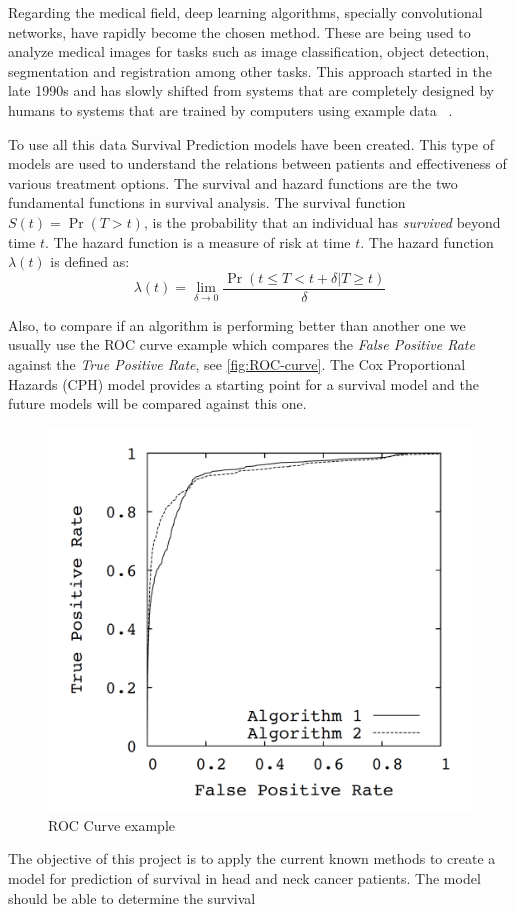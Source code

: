 \documentclass[a4paper]{article}
\begin{document}
Regarding the medical field, deep learning algorithms, specially convolutional networks, have 
rapidly become the chosen method. These are being used to analyze medical images for tasks such as
image classification, object detection, segmentation and registration among other tasks. This
approach started in the late 1990s and has slowly shifted from systems that are completely designed
by humans to systems that are trained by computers using example data
~\cite{survey-deep-learning}.

To use all this data Survival Prediction models have been created. This type of models are
used to understand the relations between patients and effectiveness of various treatment options. 
The survival and hazard functions are the two fundamental functions in survival analysis. The
survival function \( S(t) = \Pr(T > t) \), is the probability that an individual has
\emph{survived} beyond time \( t \). The hazard function is a measure of risk at time \( t \).
The hazard function \( \lambda(t) \) is defined as:
~\cite{DeepSurv}
\[
    \lambda(t) = \lim_{\delta \rightarrow 0}
    \frac{\Pr(t \le T < t + \delta | T \ge t)}{\delta}
\]


Also, to compare if an algorithm is performing better than another one we usually use the ROC curve
example which compares the \emph{False Positive Rate} against the \emph{True Positive Rate},
see \autoref{fig:ROC-curve}. The Cox Proportional Hazards (CPH) model provides a starting point for a 
survival model and the future models will be compared against this one.
~\cites{ROC-precision-recall}{Cox}

\begin{figure}
    \centering
    \includegraphics[width=.5\linewidth]{images/roc_curve}
    \caption{ROC Curve example\label{fig:ROC-curve}}
\end{figure}

The objective of this project is to apply the current known methods to create a model for prediction
of survival in head and neck cancer patients. The model should be able to determine the survival
\end{document}
